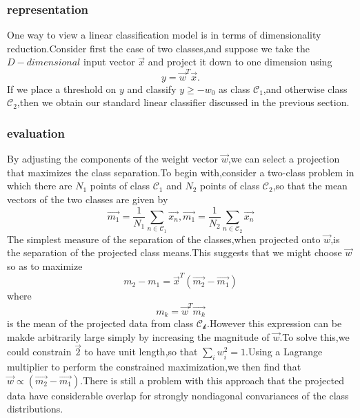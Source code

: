 \subsubsection{representation}
One way to view a linear classification model is in terms of dimensionality reduction.Consider first the case of two classes,and suppose we take the $D-dimensional$ input vector $\vec{x}$ and project it down to one dimension using
\begin{equation}\label{eqn:Fisher LDA projection}
y = \vec{w}^T\vec{x}.
\end{equation}
If we place a threshold on $y$ and classify $y \geq -w_0$ as class $\mathcal{C_1}$,and otherwise class $\mathcal{C_2}$,then we obtain our standard linear classifier discussed in the previous section.
\subsubsection{evaluation}
By adjusting the components of the weight vector $\vec{w}$,we can select a projection that maximizes the class separation.To begin with,consider a two-class problem in which there are $N_1$ points of class $\mathcal{C_1}$ and $N_2$ points of class $\mathcal{C_2}$,so that the mean vectors of the two classes are given by
\begin{equation}
\vec{m_1} = \dfrac{1}{N_1} \sum_{n\in \mathcal{C_1}}{\vec{x_n}},\vec{m_1} = \dfrac{1}{N_2}\sum_{n\in \mathcal{C_2}}\vec{x_n}
\end{equation}
The simplest measure of the separation of the classes,when projected onto $\vec{w}$,is the separation of the projected  class means.This suggests that we might choose $\vec{w}$ so as to maximize
\begin{equation}
m_2 - m_1 = \vec{x}^T(\vec{m_2}-\vec{m_1})
\end{equation}
where\begin{equation}
m_k = \vec{w}^T\vec{m_k}
\end{equation}
is the mean of the projected data from class $\mathcal{C_k}$.However this expression can be makde arbitrarily large simply by increasing the magnitude of $\vec{w}$.To solve this,we could constrain $\vec{2}$ to have unit length,so that $\sum_{i}{w_i^2}=1$.Using a Lagrange multiplier to perform the constrained maximization,we then find that $\vec{w} \propto (\vec{m_2} - \vec{m_1})$.There is still a problem with this approach that the projected data have considerable overlap for strongly nondiagonal convariances of the class distributions.

